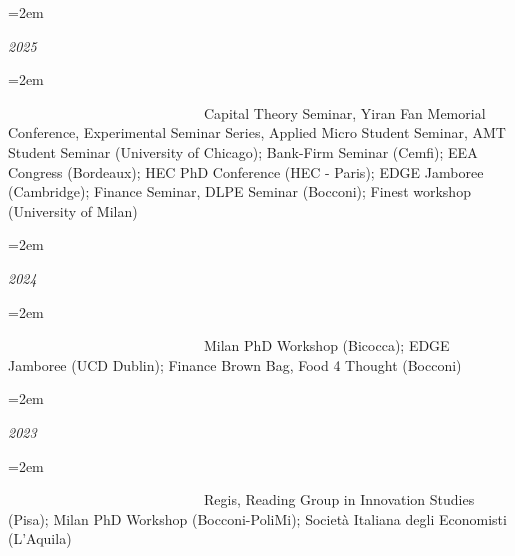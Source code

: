 \documentclass{scrartcl}
\newcommand{\MarginText}[1]{\marginpar{\raggedleft\itshape\small#1}} %
\newlength{\datebox}\settowidth{\datebox}{Spring 2011} %
\newcommand{\NewEntry}[3]{\noindent\hangindent=2em\hangafter=0 \parbox{\datebox}{\small \textit{#1}}\hspace{1.5em} #2 #3 %
\vspace{0.5em}} %
\newcommand{\Description}[1]{\hangindent=2em\hangafter=0\noindent\raggedright\footnotesize{#1}\par\normalsize\vspace{1em}} %
\begin{document}
\begin{cv}{}





\vspace{1em}

\NewEntry{2025}{}

\vspace{-1.5em}
\Description{\MarginText{}
\ \ \ \ \ \ \ \ \ \ \ \ \ \ \ \ \ \ \ \  \ \ \ \ \ \ \ \  {Capital Theory Seminar, Yiran Fan Memorial Conference, Experimental Seminar Series, Applied Micro Student Seminar, AMT Student Seminar (University of Chicago); Bank-Firm Seminar (Cemfi); EEA Congress (Bordeaux); HEC PhD Conference (HEC - Paris); EDGE Jamboree (Cambridge); Finance Seminar, DLPE Seminar (Bocconi); Finest workshop (University of Milan)}}%



\NewEntry{2024}{}

\vspace{-1.5em}
\Description{\MarginText{}
\ \ \ \ \ \ \ \ \ \ \ \ \ \ \ \ \ \ \ \  \ \ \ \ \ \ \ \  {Milan PhD Workshop (Bicocca); EDGE Jamboree (UCD Dublin); Finance Brown Bag, Food 4 Thought (Bocconi)}}%


\NewEntry{2023}{}

\vspace{-1.5em}
\Description{\MarginText{}  
\ \ \ \ \ \ \ \ \ \ \ \ \ \ \ \ \ \ \ \  \ \ \ \ \ \ \ \  {Regis, Reading Group in Innovation Studies (Pisa); Milan PhD Workshop (Bocconi-PoliMi); Società Italiana degli Economisti (L'Aquila)}}%



\end{cv}
\end{document}
